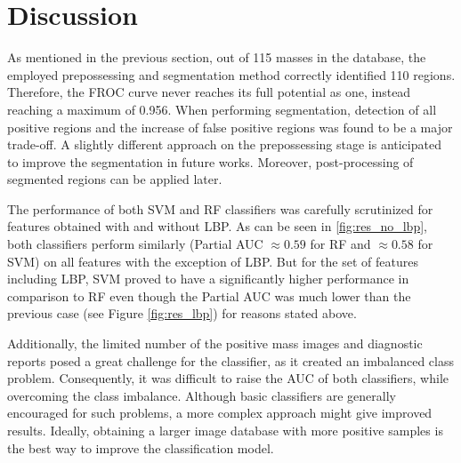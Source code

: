 \section{Discussion}

As mentioned in the previous section, out of 115 masses in the database, the employed prepossessing and segmentation method correctly identified 110 regions. Therefore, the FROC curve never reaches its full potential as one, instead reaching a maximum of 0.956. When performing segmentation, detection of all positive regions and the increase of false positive regions was found to be a major trade-off. A slightly different approach on the prepossessing stage is anticipated to improve the segmentation in future works. Moreover, post-processing of segmented regions can be applied later.


The performance of both SVM and RF classifiers was carefully scrutinized for features obtained with and without LBP. As can be seen in \ref{fig:res_no_lbp}, both classifiers perform similarly (Partial AUC $\approx 0.59$ for RF and $\approx 0.58$ for SVM) on all features with the exception of LBP. But for the set of features including LBP, SVM proved to have a significantly higher performance in comparison to RF even though the Partial AUC was much lower than the previous case (see Figure \ref{fig:res_lbp}) for reasons stated above.


Additionally, the limited number of the positive mass images and diagnostic reports posed a great challenge for the classifier, as it created an imbalanced class problem. Consequently, it was difficult to raise the AUC of both classifiers, while overcoming the class imbalance. Although basic classifiers are generally encouraged for such problems, a more complex approach might give improved results. Ideally, obtaining a larger image database with more positive samples is the best way to improve the classification model. 

